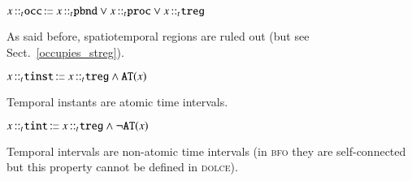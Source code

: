 \documentclass[ao]{iosart2x}
\newcommand{\bfoAxLabel}{\textrm{a$_\texttt{b}$}}
\newcommand{\dbDefLabel}{\textrm{d$_\texttt{db}$}}
\newcounter{cntdbdf}
\newcommand{\dbdf}[1]{\refstepcounter{cntdbdf}\begin{small}{\bf \dbDefLabel\thecntdbdf\label{#1}}\end{small}}
\newcommand{\refbfoax}[1]{({\bfoAxLabel}\ref{#1})}
\newcommand{\pr}[1]{\mathtt{#1}}
\newcommand{\cn}[1]{\mathtt{#1}}
\newcommand\textequal{%
 \rule[.08ex]{5pt}{0.35pt}\llap{\rule[.78ex]{5pt}{0.35pt}}}
\newcommand{\sdef}{{\hspace{1.5pt}:\hspace{-2.5pt}\textequal\hspace{3pt}}}
\newcommand{\dolce}{{\textsc{dolce}}}
\newcommand{\bfo}{{\textsc{bfo}}}
\newcommand {\Tdcat} {\textsc{t}}
\newcommand {\ATd} {\ensuremath{\pr{AT}}}
\newcommand{\occbcat}{\cn{occ}}
\newcommand{\procbcat}{\cn{proc}}
\newcommand{\pbndbcat}{\cn{pbnd}}
\newcommand{\tregbcat}{\cn{treg}}
\newcommand{\stregbcat}{\cn{streg}}
\newcommand{\tinstbcat}{\cn{tinst}}
\newcommand{\tintbcat}{\cn{tint}}
\newcommand{\bfoexist}{\pr{EX}}
\newcommand{\bfoiof}[1]{{\,::_{#1\:\!}}}
\begin{document}
%
%
%

\item[\dbdf{d2b_occ}] $x \bfoiof{t} \occbcat \sdef x \bfoiof{t} \pbndbcat \lor x \bfoiof{t} \procbcat \lor x \bfoiof{t} \tregbcat$

\vspace{1pt}
As said before, spatiotemporal regions are ruled out (but see Sect.~\ref{occupies_streg}).

%

\item[\dbdf{d2b_tinst}]  $x \bfoiof{t} \tinstbcat \sdef x \bfoiof{t} \tregbcat \land \ATd(x)$

\vspace{1pt}
Temporal instants are atomic time intervals.

% 

\item[\dbdf{d2b_tint}] $x \bfoiof{t} \tintbcat \sdef x \bfoiof{t} \tregbcat \land \neg\ATd(x)$

\vspace{1pt}
Temporal intervals are non-atomic time intervals (in {\bfo} they are self-connected but this property cannot be defined in {\dolce}).
\end{document}
